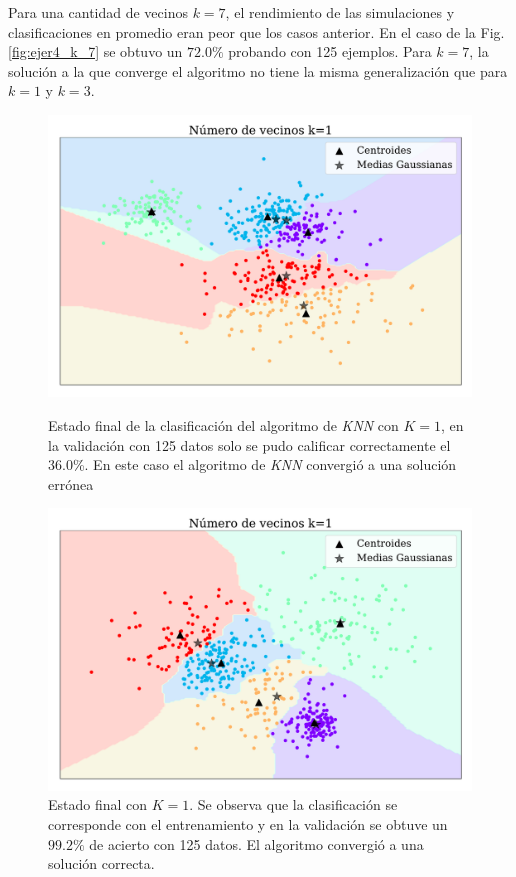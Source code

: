     Para una cantidad de vecinos $k=7$, el rendimiento de las  simulaciones y clasificaciones en promedio eran peor que los casos anterior. En el caso de la Fig.\,\ref{fig:ejer4_k_7} se obtuvo un $72.0\%$ probando con 125 ejemplos. Para $k=7$, la solución a la que converge el algoritmo no tiene la misma generalización que para $k=1$ y $k=3$.

    
\begin{figure}[H]
    \centering
    \begin{minipage}{.485\textwidth}
        \centering
        \includegraphics[width=\linewidth]{plots/ejer_4_K-1_no_coverge.pdf}
        \caption{Estado final de la clasificación del algoritmo de \emph{KNN} con $K=1$, en la validación con 125 datos solo se pudo calificar correctamente el 36.0\%. En este caso el algoritmo de \emph{KNN} convergió a  una solución errónea}
        \label{fig:ejer4_k_1_malo}
    \end{minipage}%
    \hfill
    \begin{minipage}{.485\textwidth}
        \centering
        \includegraphics[width=\linewidth]{plots/ejer_4_K-1_si_converge.pdf}
        \caption{Estado final con $K=1$. Se observa que la clasificación se corresponde con el entrenamiento y en la validación se obtuve un $99.2\%$ de acierto con 125 datos. El algoritmo convergió a  una solución correcta.}
        \label{fig:ejer4_k_1}
    \end{minipage}
\end{figure}


